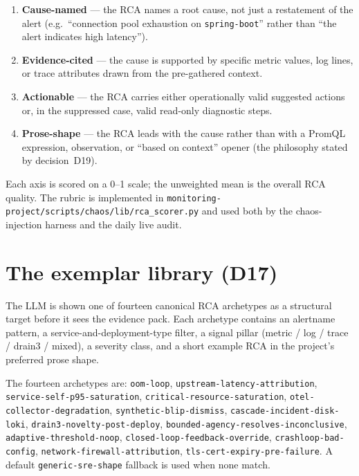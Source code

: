 \documentclass[11pt,a4paper,oneside]{report}
\begin{document}
\begin{enumerate}
  \item \textbf{Cause-named} --- the RCA names a root cause, not just
        a restatement of the alert (e.g.\ ``connection pool exhaustion
        on \texttt{spring-boot}'' rather than ``the alert indicates
        high latency'').
  \item \textbf{Evidence-cited} --- the cause is supported by specific
        metric values, log lines, or trace attributes drawn from the
        pre-gathered context.
  \item \textbf{Actionable} --- the RCA carries either operationally
        valid suggested actions or, in the suppressed case, valid
        read-only diagnostic steps.
  \item \textbf{Prose-shape} --- the RCA leads with the cause rather
        than with a PromQL expression, observation, or
        ``based on context'' opener (the philosophy stated by
        decision~D19).
\end{enumerate}

Each axis is scored on a 0--1 scale; the unweighted mean is the
overall RCA quality.  The rubric is implemented in
\texttt{monitoring-project/scripts/chaos/lib/rca\_scorer.py} and used
both by the chaos-injection harness and the daily live audit.

\section{The exemplar library (D17)}

\begin{notebox}[title={Decision D17 --- Exemplar injection}]
The LLM is shown one of fourteen canonical RCA archetypes as a
structural target before it sees the evidence pack.  Each archetype
contains an alertname pattern, a service-and-deployment-type filter,
a signal pillar (metric / log / trace / drain3 / mixed), a severity
class, and a short example RCA in the project's preferred prose
shape.
\end{notebox}

The fourteen archetypes are: \texttt{oom-loop},
\texttt{upstream-latency-attribution},
\texttt{service-self-p95-saturation},
\texttt{critical-resource-saturation},
\texttt{otel-collector-degradation},
\texttt{synthetic-blip-dismiss},
\texttt{cascade-incident-disk-loki},
\texttt{drain3-novelty-post-deploy},
\texttt{bounded-agency-resolves-inconclusive},
\texttt{adaptive-threshold-noop},
\texttt{closed-loop-feedback-override},
\texttt{crashloop-bad-config},
\texttt{network-firewall-attribution},
\texttt{tls-cert-expiry-pre-failure}.  A default
\texttt{generic-sre-shape} fallback is used when none match.
\end{document}
